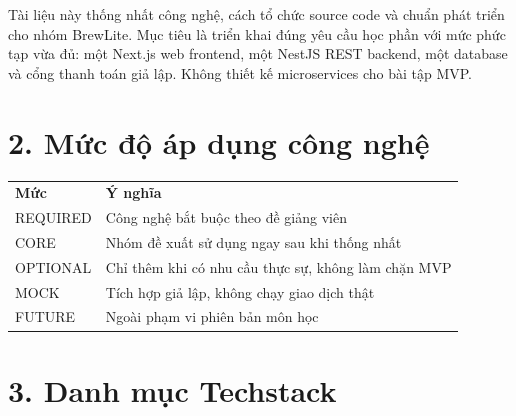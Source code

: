 \documentclass[11pt,a4paper,oneside]{report}
\begin{document}
Tài liệu này thống nhất công nghệ, cách tổ chức source code và chuẩn phát triển cho nhóm BrewLite. Mục tiêu là triển khai đúng yêu cầu học phần với mức phức tạp vừa đủ: một Next.js web frontend, một NestJS REST backend, một database và cổng thanh toán giả lập. Không thiết kế microservices cho bài tập MVP.

\section{\texorpdfstring{\textbf{2. Mức độ áp dụng công nghệ}}{2. Mức độ áp dụng công nghệ}}\label{05-techstack:mux1ee9c-ux111ux1ed9-uxe1p-dux1ee5ng-cuxf4ng-nghux1ec7}

\begin{longtable}[]{@{}
  >{\raggedright\arraybackslash}p{}
  >{\raggedright\arraybackslash}p{}@{}}
\toprule\noalign{}
\endhead
\bottomrule\noalign{}
\endlastfoot
\textbf{Mức} & \textbf{Ý nghĩa} \\
REQUIRED & Công nghệ bắt buộc theo đề giảng viên \\
CORE & Nhóm đề xuất sử dụng ngay sau khi thống nhất \\
OPTIONAL & Chỉ thêm khi có nhu cầu thực sự, không làm chặn MVP \\
MOCK & Tích hợp giả lập, không chạy giao dịch thật \\
FUTURE & Ngoài phạm vi phiên bản môn học \\
\end{longtable}

\section{\texorpdfstring{\textbf{3. Danh mục Techstack}}{3. Danh mục Techstack}}\label{05-techstack:danh-mux1ee5c-techstack}
\end{document}
